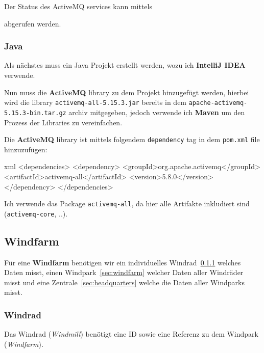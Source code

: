 Der Status des ActiveMQ services kann mittels


abgerufen werden.

\subsubsection{Java}

Als nächstes muss ein Java Projekt erstellt werden, wozu ich \textbf{IntelliJ IDEA} verwende.

Nun muss die \textbf{ActiveMQ} library zu dem Projekt hinzugefügt werden, hierbei wird die library \texttt{activemq-all-5.15.3.jar} bereits in dem \texttt{apache-activemq-5.15.3-bin.tar.gz} archiv mitgegeben, jedoch verwende ich \textbf{Maven} um den Prozess der Libraries zu vereinfachen.

Die \textbf{ActiveMQ} library ist mittels folgendem \texttt{dependency} tag in dem \texttt{pom.xml} file hinzuzufügen:

\begin{code}{xml}
<dependencies>
    <dependency>
        <groupId>org.apache.activemq</groupId>
        <artifactId>activemq-all</artifactId>
        <version>5.8.0</version>
    </dependency>
</dependencies>
\end{code}

Ich verwende das Package \texttt{activemq-all}, da hier alle Artifakte inkludiert sind (\texttt{activemq-core}, ..).

\clearpage




\subsection{Windfarm}

Für eine \textbf{Windfarm} benötigen wir ein individuelles Windrad~\ref{sec:windmill} welches Daten misst, einen Windpark~\ref{sec:windfarm} welcher Daten aller Windräder misst und eine Zentrale~\ref{sec:headquarters} welche die Daten aller Windparks misst.

\subsubsection{Windrad}
\label{sec:windmill}

Das Windrad (\textit{Windmill}) benötigt eine ID sowie eine Referenz zu dem Windpark (\textit{Windfarm}).

